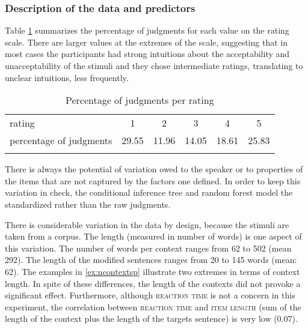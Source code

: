 \subsubsection{Description of the data and predictors}

Table \ref{tab:judgesepev}  summarizes the percentage of judgments for each value on the rating scale. There are  larger values at the extremes of the scale, suggesting that in most cases the participants had strong intuitions about the acceptability and unacceptability of the stimuli and they chose intermediate ratings, translating to unclear intuitions, less frequently.

\begin{table}
\begin{tabular}{l c c c c c}
\lsptoprule
rating & 1& 2& 3& 4& 5\\
percentage of judgments & 29.55 & 11.96 & 14.05& 18.61 & 25.83\\
\lspbottomrule
\end{tabular}
\caption{Percentage of judgments per rating\label{tab:judgesepev}}
\end{table}

There is always the potential of variation owed to the speaker or to properties of the items that are not captured by the factors one defined. In order to keep this variation in check,   the conditional inference tree and random forest  model the standardized rather than the raw judgments.

There is  considerable variation in the data by design, because the stimuli are taken from a corpus. The length (measured in number of words) is one aspect of this variation. The number of words per context ranges from 62 to 502 (mean 292). The length of the modified sentences ranges from 20 to 145 words (mean: 62). The examples in \eqref{ex:ncontextsp} illustrate two extremes in terms of context length.  In spite of these differences, the length of the contexts did not  provoke a significant effect. Furthermore, although \textsc{reaction time} is not a concern in this experiment, the correlation between \textsc{reaction time} and \textsc{item length} (sum of the length of the  context plus the length of the targets sentence) is very low (0.07).

